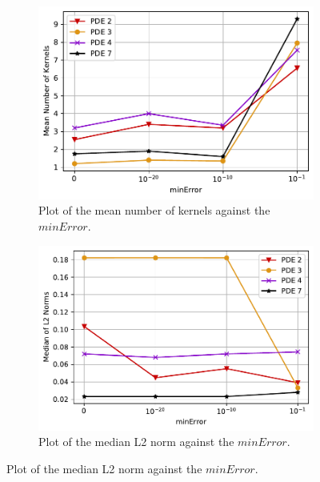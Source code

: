 \documentclass[./\jobname.tex]{subfiles}
\begin{document}
\begin{figure}[H]
	\centering
	\begin{subfigure}[b]{0.5\linewidth}
		\centering
		\includegraphics[width=1\textwidth]{../../code/experiments/misc/pde2347_minError_kernelNR.pdf}
		\caption{Plot of the mean number of kernels against the $minError$.}
		\label{fig:subexperiment_pde2347_minerror_kernelNR}
	\end{subfigure}%
	\begin{subfigure}[b]{0.52\linewidth}
		\centering
		\includegraphics[width=1\textwidth]{../../code/experiments/misc/pde2347_minError_L2norm.pdf}
		\caption{Plot of the median L2 norm against the $minError$.}
		\label{fig:subexperiment_pde2347_minerror_l2norm}
	\end{subfigure}%
	\label{fig:subexperiment_pde2347_minerror}
\end{figure}
\end{document}
